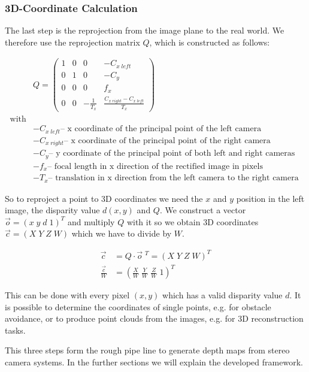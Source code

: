 \documentclass[11pt]{article}
\begin{document}
\subsubsection{3D-Coordinate Calculation}
The last step is the reprojection from the image plane to the real world. We therefore use the reprojection matrix $Q$, which is constructed as follows:

\begin{align*}
&Q=
\begin{pmatrix}
1 & 0 & 0 & -C_{x\;left} \\
0 & 1 & 0 & -C_{y} \\
0 & 0 & 0 & f_x \\
0 & 0 & -\frac{1}{T_x} & \frac{C_{x\;right}-C_{x\;left}}{T_x}
\end{pmatrix}\\
\textrm{with}\\
&-C_{x\;left} \textrm{-- x coordinate of the principal point of the left camera }\\
&-C_{x\;right} \textrm{-- x coordinate of the principal point of the right camera }\\
&-C_{y} \textrm{-- y coordinate of the principal point of both left and right cameras  }\\
&-f_x \textrm{-- focal length in x direction of the rectified image in pixels}\\
&-T_x \textrm{-- translation in x direction from the left camera to the right camera }
\end{align*}

So to reproject a point to 3D coordinates we need the $x$ and $y$ position in the left image, the disparity value $d(x,y)$ and $Q$. We construct a vector $\vec{o}=(x\;y\;d\;1)^T$ and multiply $Q$ with it so we obtain 3D coordinates $\vec{c}=(X\;Y\;Z\;W)$ which we have to divide by $W$.

\begin{align*}
	\vec{c}&=Q\cdot \vec{o}\;^T = (X\;Y\;Z\;W)^T\\
	\frac{\vec{c}}{W}&=\left(\frac{X}{W}\;\frac{Y}{W}\;\frac{Z}{W}\;1\right)^T
\end{align*}

This can be done with every pixel $(x,y)$ which has a valid disparity value $d$. It is possible to determine the coordinates of single points, e.g. for obstacle avoidance, or to produce point clouds from the images, e.g. for 3D reconstruction tasks.


\bigskip This three steps form the rough pipe line to generate depth maps from stereo camera systems. In the further sections we will explain the developed framework.
\end{document}
